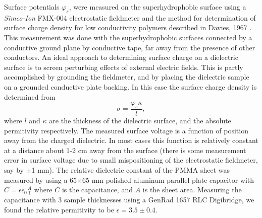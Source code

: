 \documentclass[12pt,a4paper,oneside]{book}
\begin{document}
Surface potentials $\varphi_s$, were measured on the superhydrophobic surface using a \emph{Simco-Ion} FMX-004 electrostatic fieldmeter and the method for determination of surface charge density for low conductivity polymers described in Davies, 1967 \cite{davies_examination_1967}. This measurement was done with the superhydrophobic surfaces connected by a conductive ground plane by conductive tape, far away from the presence of other conductors. An ideal approach to determining surface charge on a dielectric surface is to screen perturbing effects of external electric fields. This is partly accomplished by grounding the fieldmeter, and by placing the dielectric sample on a grounded conductive plate backing. In this case the surface charge density is determined from
\[ \sigma = \frac{\varphi_s \kappa}{l}, \]
where $l$ and $\kappa$ are the thickness of the dielectric surface, and the absolute permitivity respectively. The measured surface voltage is a function of position away from the charged dielectric. In most cases this function is relatively constant at a distance about 1-2 cm away from the surface (there is some measurement error in surface voltage due to small mispositioning of the electrostatic fieldmeter, say by $\pm$1 mm). The relative dielectric constant of the PMMA sheet was measured by using a 65$\times$65 mm polished aluminum parallel plate capacitor with $C = \epsilon \epsilon_0 \frac{A}{l}$ where $C$ is the capacitance, and $A$ is the sheet area. Measuring the capacitance with 3 sample thicknesses using a GenRad 1657 RLC Digibridge, we found the relative permitivity to be $\epsilon = 3.5 \pm 0.4$.  
\end{document}
